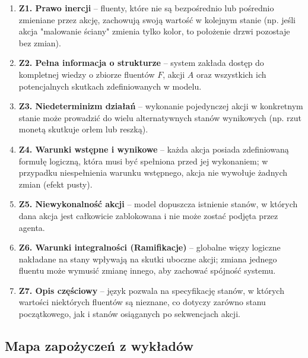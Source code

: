 \documentclass[11pt,a4paper]{article}
\theoremstyle{definition}
\begin{document}
\begin{enumerate}

\item \textbf{Z1. Prawo inercji} – fluenty, które nie są bezpośrednio lub pośrednio zmieniane przez akcję, zachowują swoją wartość w kolejnym stanie (np. jeśli akcja "malowanie ściany" zmienia tylko kolor, to położenie drzwi pozostaje bez zmian).

\item \textbf{Z2. Pełna informacja o strukturze} – system zakłada dostęp do kompletnej wiedzy o zbiorze fluentów $F$, akcji $A$ oraz wszystkich ich potencjalnych skutkach zdefiniowanych w modelu.

\item \textbf{Z3. Niedeterminizm działań} – wykonanie pojedynczej akcji w konkretnym stanie może prowadzić do wielu alternatywnych stanów wynikowych (np. rzut monetą skutkuje orłem lub reszką).

\item \textbf{Z4. Warunki wstępne i wynikowe} – każda akcja posiada zdefiniowaną formułę logiczną, która musi być spełniona przed jej wykonaniem; w przypadku niespełnienia warunku wstępnego, akcja nie wywołuje żadnych zmian (efekt pusty).

\item \textbf{Z5. Niewykonalność akcji} – model dopuszcza istnienie stanów, w których dana akcja jest całkowicie zablokowana i nie może zostać podjęta przez agenta.

\item \textbf{Z6. Warunki integralności (Ramifikacje)} – globalne więzy logiczne nakładane na stany wpływają na skutki uboczne akcji; zmiana jednego fluentu może wymusić zmianę innego, aby zachować spójność systemu.

\item \textbf{Z7. Opis częściowy} – język pozwala na specyfikację stanów, w których wartości niektórych fluentów są nieznane, co dotyczy zarówno stanu początkowego, jak i stanów osiąganych po sekwencjach akcji.

\end{enumerate}

\subsection{Mapa zapożyczeń z wykładów}
\end{document}
